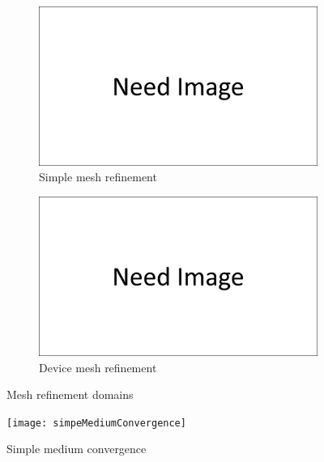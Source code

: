 \begin{figure}
    \centering
    \begin{subfigure}[b]{0.45\textwidth}
        \centering
        \includegraphics[width=\textwidth]{images/need_image.png}
        \caption{Simple mesh refinement}
        \label{fig:simple_mesh_refinement_domain}
    \end{subfigure}
    \hfill
    \begin{subfigure}[b]{0.45\textwidth}
        \centering
        \includegraphics[width=\textwidth]{images/need_image.png}
        \caption{Device mesh refinement}
        \label{fig:device_mesh_refinement_domain}
    \end{subfigure}
    \caption{Mesh refinement domains}
    \label{fig:mesh_refinement_domain}
\end{figure}

\begin{figure}
    \centering
    \texttt{[image: simpeMediumConvergence]}
    \caption{Simple medium convergence}
    \label{fig:simple_medium_convergence}
\end{figure}


